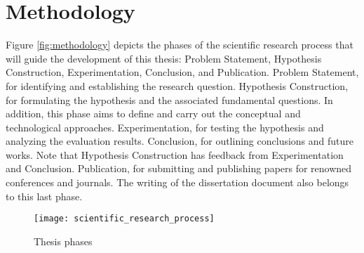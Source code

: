 \section{Methodology}
\label{sec:methodology}

Figure \ref{fig:methodology} depicts the phases of the scientific research process that will guide the development of this thesis: Problem Statement, Hypothesis Construction, Experimentation, Conclusion, and Publication. Problem Statement, for identifying and establishing the research question. Hypothesis Construction, for formulating the hypothesis and the associated fundamental questions. In addition, this phase aims to define and carry out the conceptual and technological approaches. Experimentation, for testing the hypothesis and analyzing the evaluation results. Conclusion, for outlining conclusions and future works. Note that Hypothesis Construction has feedback from Experimentation and Conclusion. Publication, for submitting and publishing papers for renowned conferences and journals. The writing of the dissertation document also belongs to this last phase.

\begin{figure}[!ht]
    \centering
    \texttt{[image: scientific\_research\_process]}
    \caption{Thesis phases}
    \label{fig:scientific_research_process}
\end{figure}
